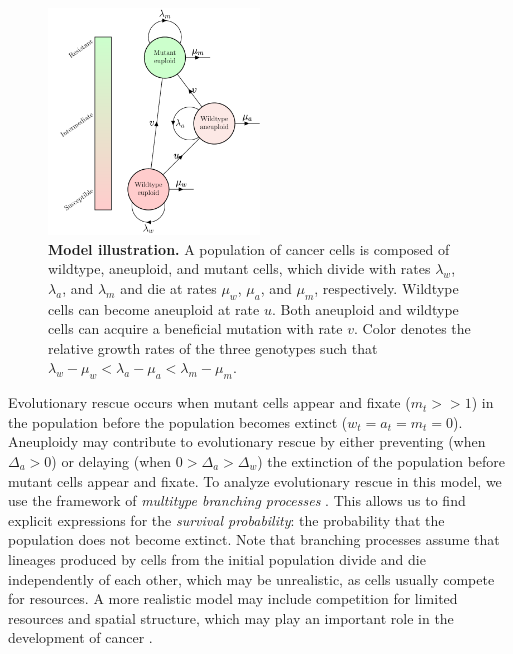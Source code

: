 \documentclass[12pt]{extarticle}
\begin{document}
\begin{figure}[!t]
\centering
\includegraphics[width=0.5\textwidth]{Figures/figureAneuploidy.pdf}
\caption{
\textbf{Model illustration.}
A population of cancer cells is composed of wildtype, aneuploid, and mutant cells, which divide with rates $\lambda_w$, $\lambda_a$, and $\lambda_m$ and die at rates $\mu_w$, $\mu_a$, and $\mu_m$, respectively. 
Wildtype cells can become aneuploid at rate $u$. Both aneuploid and wildtype cells can acquire a beneficial mutation with rate $v$. Color denotes the relative growth rates of the three genotypes such that $\lambda_w - \mu_w < \lambda_a - \mu_a < \lambda_m - \mu_m$.
}
\label{figureAneuploidy}
\end{figure}

Evolutionary rescue occurs when mutant cells appear and fixate ($m_t>>1$) in the population before the population becomes extinct ($w_t=a_t=m_t=0$).
Aneuploidy may contribute to evolutionary rescue by either preventing (when $\Delta_a>0$) or delaying (when $0>\Delta_a>\Delta_w$) the extinction of the population before mutant cells appear and fixate.
To analyze evolutionary rescue in this model, we use the framework of \emph{multitype branching processes} \citep{rybnikov2021fitness,harris1963theory}. 
This allows us to find explicit expressions for the \emph{survival probability}: the probability that the population does not become extinct.
Note that branching processes assume that lineages produced by cells from the initial population divide and die independently of each other, which may be unrealistic, as cells usually compete for resources.
A more realistic model may include competition for limited resources and spatial structure, which may play an important role in the development of cancer \citep[e.g.,][]{martens2011spatial}.
\end{document}
